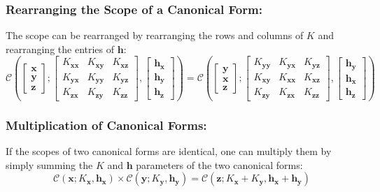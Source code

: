 \documentclass[12pt,oneside,openany,a4paper, %
afrikaans,english,
]{memoir}
\numberwithin{equation}{chapter}
\begin{document}
\subsubsection{Rearranging the Scope of a Canonical Form:}
The scope can be rearranged by rearranging the rows and columns of $K$  and rearranging the entries of $\bm{h}$:
\begin{equation}
\mathcal{C}\left(
\begin{bmatrix}
\bm{x}\\
\bm{y}\\
\bm{z}
\end{bmatrix};
\begin{bmatrix}
K_{\bm{xx}} & K_{\bm{xy}} & K_{\bm{xz}}\\
K_{\bm{yx}} & K_{\bm{yy}} & K_{\bm{yz}}\\
K_{\bm{zx}} & K_{\bm{zy}} & K_{\bm{zz}}
\end{bmatrix},
\begin{bmatrix}
\bm{h_x}\\
\bm{h_y}\\
\bm{h_z}
\end{bmatrix}
\right)
=
\mathcal{C}\left(
\begin{bmatrix}
\bm{y}\\
\bm{x}\\
\bm{z}
\end{bmatrix};
\begin{bmatrix}
K_{\bm{yy}} & K_{\bm{yx}} & K_{\bm{yz}}\\
K_{\bm{xy}} & K_{\bm{xx}} & K_{\bm{xz}}\\
K_{\bm{zy}} & K_{\bm{zx}} & K_{\bm{zz}}
\end{bmatrix},
\begin{bmatrix}
\bm{h_y}\\
\bm{h_x}\\
\bm{h_z}
\end{bmatrix}
\right)
\end{equation}
\subsubsection{Multiplication of Canonical Forms:}
If the scopes of two canonical forms are identical, one can multiply them by simply summing the $K$ and $\bm{h}$ parameters of the two canonical forms:
\begin{equation}\label{eq:10}
\mathcal{C} (\bm{x}; K_{\bm{x}},\bm{h_x}) \times \mathcal{C} (\bm{y}; K_{\bm{y}},\bm{h_y})= \mathcal{C} (\bm{z};K_{\bm{x}} + K_{\bm{y}}, \bm{h_x} + \bm{h_y})
\end{equation}
\end{document}
